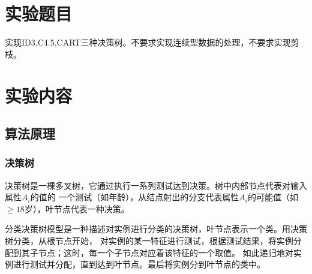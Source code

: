 \documentclass[UTF8,a4paper,12pt]{article}
\begin{document}
\begin{titlepage}
    \begin{center}
        \phantom{Start!}
    	  \vspace{2cm}
        {
            \setlength{\baselineskip}{40pt}
            \vspace{1cm}
        }
    \end{center}
\end{titlepage}

\section{实验题目}
\par 实现ID3,C4.5,CART三种决策树。不要求实现连续型数据的处理，不要求实现剪枝。
\section{实验内容}
\subsection{算法原理}
\subsubsection{决策树}
\par 决策树是一棵多叉树，它通过执行一系列测试达到决策。树中内部节点代表对输入属性$A_i$的值的
一个测试（如年龄），从结点射出的分支代表属性$A_i$的可能值（如$\ge 18$岁），叶节点代表一种决策。
\par 分类决策树模型是一种描述对实例进行分类的决策树，叶节点表示一个类。用决策树分类，从根节点开始，
对实例的某一特征进行测试，根据测试结果，将实例分配到其子节点；这时，每一个子节点对应着该特征的一个取值。
如此递归地对实例进行测试并分配，直到达到叶节点。最后将实例分到叶节点的类中。
\end{document}
